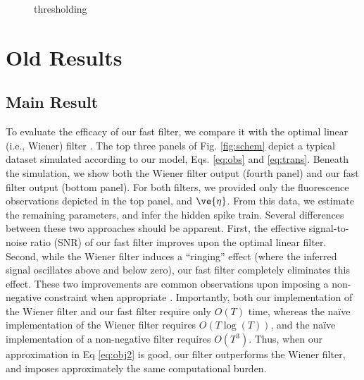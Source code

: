 \begin{figure}
\caption{thresholding}
\end{figure}

















\section{Old Results}
\subsection{Main Result}

To evaluate the efficacy of our fast filter, we compare it with the optimal linear (i.e., Wiener) filter \cite{Wiener49}. The top three panels of Fig. \ref{fig:schem} depict a typical dataset simulated according to our model, Eqs. \eqref{eq:obs} and \eqref{eq:trans}. Beneath the simulation, we show both the Wiener filter output (fourth panel) and our fast filter output (bottom panel).  For both filters, we provided only the fluorescence observations depicted in the top panel, and $\ve{\eta}$.  From this data, we estimate the remaining parameters, and infer the hidden spike train. Several differences between these two approaches should be apparent.  First, the effective signal-to-noise ratio (SNR) of our fast filter improves upon the optimal linear filter.  Second, while the Wiener filter induces a ``ringing'' effect (where the inferred signal oscillates above and below zero), our fast filter completely eliminates this effect.  These two improvements are common observations upon imposing a non-negative constraint when appropriate \cite{ShumwayStoffer06}.  Importantly, both our implementation of the Wiener filter and our fast filter require only $O(T)$ time, whereas the na\"{i}ve implementation of the Wiener filter requires $O(T \log(T))$, and the na\"{i}ve implementation of a non-negative filter requires $O(T^3)$.  Thus, when our approximation in Eq \eqref{eq:obj2} is good, our filter outperforms the Wiener filter, and imposes approximately the same computational burden.

